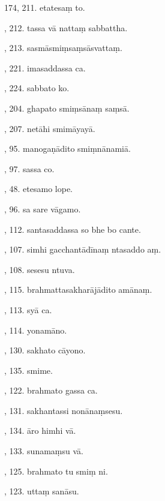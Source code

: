 174, 211. etatesaṃ to.\hfill \pageref{sut:174}\par {}, 212. tassa vā nattaṃ sabbattha.\hfill \pageref{sut:175}\par {}, 213. sasmāsmiṃsaṃsāsvattaṃ.\hfill \pageref{sut:176}\par {}, 221. imasaddassa ca.\hfill \pageref{sut:177}\par {}, 224. sabbato ko.\hfill \pageref{sut:178}\par {}, 204. ghapato smiṃsānaṃ saṃsā.\hfill \pageref{sut:179}\par {}, 207. netāhi smimāyayā.\hfill \pageref{sut:180}\par {}, 95. manogaṇādito smiṃnānamiā.\hfill \pageref{sut:181}\par {}, 97. sassa co.\hfill \pageref{sut:182}\par {}, 48. etesamo lope.\hfill \pageref{sut:183}\par {}, 96. sa sare vāgamo.\hfill \pageref{sut:184}\par {}, 112. santasaddassa so bhe bo cante.\hfill \pageref{sut:185}\par {}, 107. simhi gacchantādīnaṃ ntasaddo aṃ.\hfill \pageref{sut:186}\par {}, 108. sesesu ntuva.\hfill \pageref{sut:187}\par {}, 115. brahmattasakharājādito amānaṃ.\hfill \pageref{sut:188}\par {}, 113. syā ca.\hfill \pageref{sut:189}\par {}, 114. yonamāno.\hfill \pageref{sut:190}\par {}, 130. sakhato cāyono.\hfill \pageref{sut:191}\par {}, 135. smime.\hfill \pageref{sut:192}\par {}, 122. brahmato gassa ca.\hfill \pageref{sut:193}\par {}, 131. sakhantassi nonānaṃsesu.\hfill \pageref{sut:194}\par {}, 134. āro himhi vā.\hfill \pageref{sut:195}\par {}, 133. sunamaṃsu vā.\hfill \pageref{sut:196}\par {}, 125. brahmato tu smiṃ ni.\hfill \pageref{sut:197}\par {}, 123. uttaṃ sanāsu.\hfill \pageref{sut:198}\par \noindent
